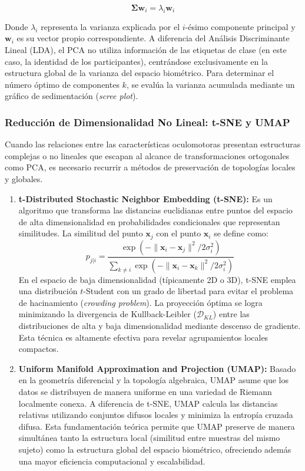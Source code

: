 \begin{equation}
	\boldsymbol{\Sigma} \mathbf{w}_i = \lambda_i \mathbf{w}_i
\end{equation}

Donde $\lambda_i$ representa la varianza explicada por el $i$-ésimo componente principal y $\mathbf{w}_i$ es su vector propio correspondiente. A diferencia del Análisis Discriminante Lineal (LDA), el PCA no utiliza información de las etiquetas de clase (en este caso, la identidad de los participantes), centrándose exclusivamente en la estructura global de la varianza del espacio biométrico. Para determinar el número óptimo de componentes $k$, se evalúa la varianza acumulada mediante un gráfico de sedimentación (\textit{scree plot}).

\subsubsection{Reducción de Dimensionalidad No Lineal: t-SNE y UMAP}
Cuando las relaciones entre las características oculomotoras presentan estructuras complejas o no lineales que escapan al alcance de transformaciones ortogonales como PCA, es necesario recurrir a métodos de preservación de topologías locales y globales.

\begin{enumerate}
	\item \textbf{t-Distributed Stochastic Neighbor Embedding (t-SNE):} Es un algoritmo que transforma las distancias euclidianas entre puntos del espacio de alta dimensionalidad en probabilidades condicionales que representan similitudes. La similitud del punto $\mathbf{x}_j$ con el punto $\mathbf{x}_i$ se define como:
	\begin{equation}
		p_{j|i} = \frac{\exp(-\|\mathbf{x}_i - \mathbf{x}_j\|^2 / 2\sigma_i^2)}{\sum_{k \neq i} \exp(-\|\mathbf{x}_i - \mathbf{x}_k\|^2 / 2\sigma_i^2)}
	\end{equation}
	En el espacio de baja dimensionalidad (típicamente 2D o 3D), t-SNE emplea una distribución $t$-Student con un grado de libertad para evitar el problema de hacinamiento (\textit{crowding problem}). La proyección óptima se logra minimizando la divergencia de Kullback-Leibler ($\mathcal{D}_{KL}$) entre las distribuciones de alta y baja dimensionalidad mediante descenso de gradiente. Esta técnica es altamente efectiva para revelar agrupamientos locales compactos.
	
	\item \textbf{Uniform Manifold Approximation and Projection (UMAP):} Basado en la geometría diferencial y la topología algebraica, UMAP asume que los datos se distribuyen de manera uniforme en una variedad de Riemann localmente conexa. A diferencia de t-SNE, UMAP calcula las distancias relativas utilizando conjuntos difusos locales y minimiza la entropía cruzada difusa. Esta fundamentación teórica permite que UMAP preserve de manera simultánea tanto la estructura local (similitud entre muestras del mismo sujeto) como la estructura global del espacio biométrico, ofreciendo además una mayor eficiencia computacional y escalabilidad.
\end{enumerate}


